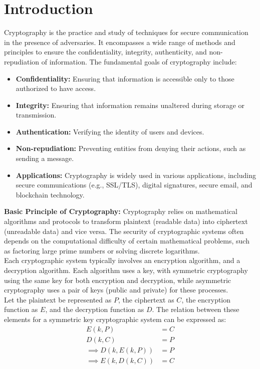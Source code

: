 \documentclass[openany]{book}
\begin{document}
\section{Introduction}
Cryptography is the practice and study of techniques for secure communication in the presence of adversaries. It encompasses a wide range of methods and principles to ensure the confidentiality, integrity, authenticity, and non-repudiation of information. The fundamental goals of cryptography include:
\begin{itemize}
    \item \textbf{Confidentiality:} Ensuring that information is accessible only to those authorized to have access.
    \item \textbf{Integrity:} Ensuring that information remains unaltered during storage or transmission.
    \item \textbf{Authentication:} Verifying the identity of users and devices.
    \item \textbf{Non-repudiation:} Preventing entities from denying their actions, such as sending a message.
    \item \textbf{Applications:} Cryptography is widely used in various applications, including secure communications (e.g., SSL/TLS), digital signatures, secure email, and blockchain technology.
\end{itemize}
\textbf{Basic Principle of Cryptography:} Cryptography relies on mathematical algorithms and protocols to transform plaintext (readable data) into ciphertext (unreadable data) and vice versa. The security of cryptographic systems often depends on the computational difficulty of certain mathematical problems, such as factoring large prime numbers or solving discrete logarithms. \\
Each cryptographic system typically involves an encryption algorithm, and a decryption algorithm. Each algorithm uses a key, with symmetric cryptography using the same key for both encryption and decryption, while asymmetric cryptography uses a pair of keys (public and private) for these processes. \\
Let the plaintext be represented as \( P \), the ciphertext as \( C \), the encryption function as \( E \), and the decryption function as \( D \). The relation between these elements for a symmetric key cryptographic system can be expressed as:
\begin{align*}
    E(k, P) &= C \\
    D(k, C) &= P \\ 
    \implies D(k, E(k, P)) &= P \\
    \implies E(k, D(k, C)) &= C
\end{align*}
\end{document}
